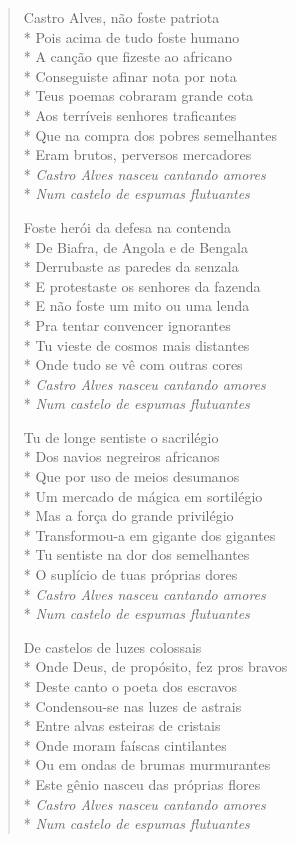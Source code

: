 \begin{verse}
Castro Alves, não foste patriota\\*
Pois acima de tudo foste humano\\*
A canção que fizeste ao africano\\*
Conseguiste afinar nota por nota\\*
Teus poemas cobraram grande cota\\*
Aos terríveis senhores traficantes\\*
Que na compra dos pobres semelhantes\\*
Eram brutos, perversos mercadores\\*
\textit{Castro Alves nasceu cantando amores}\\*
\textit{Num castelo de espumas flutuantes}

Foste herói da defesa na contenda\\*
De Biafra, de Angola e de Bengala\\*
Derrubaste as paredes da senzala\\*
E protestaste os senhores da fazenda\\*
E não foste um mito ou uma lenda\\*
Pra tentar convencer ignorantes\\*
Tu vieste de cosmos mais distantes\\*
Onde tudo se vê com outras cores\\*
\textit{Castro Alves nasceu cantando amores}\\*
\textit{Num castelo de espumas flutuantes}

Tu de longe sentiste o sacrilégio\\*
Dos navios negreiros africanos\\*
Que por uso de meios desumanos\\*
Um mercado de mágica em sortilégio\\*
Mas a força do grande privilégio\\*
Transformou-a em gigante dos gigantes\\*
Tu sentiste na dor dos semelhantes\\*
O suplício de tuas próprias dores\\*
\textit{Castro Alves nasceu cantando amores}\\*
\textit{Num castelo de espumas flutuantes}

De castelos de luzes colossais\\*
Onde Deus, de propósito, fez pros bravos\\*
Deste canto o poeta dos escravos\\*
Condensou-se nas luzes de astrais\\*
Entre alvas esteiras de cristais\\*
Onde moram faíscas cintilantes\\*
Ou em ondas de brumas murmurantes\\*
Este gênio nasceu das próprias flores\\*
\textit{Castro Alves nasceu cantando amores}\\*
\textit{Num castelo de espumas flutuantes}


\end{verse}

